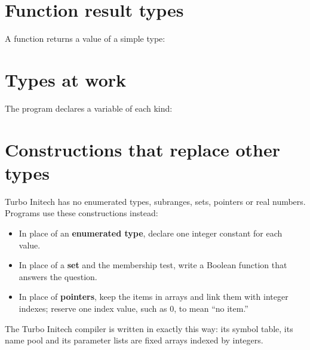 \section{Function result types}
A function returns a value of a simple type:


\section{Types at work}
The program  declares a variable of each kind:



\section{Constructions that replace other types}
Turbo Initech has no enumerated types, subranges, sets, pointers or real
numbers.  Programs use these constructions instead:

\begin{itemize}
\item In place of an \textbf{enumerated type}, declare one integer constant
  for each value.
\item In place of a \textbf{set} and the membership test, write a Boolean
  function that answers the question.
\item In place of \textbf{pointers}, keep the items in arrays and link
  them with integer indexes; reserve one index value, such as 0, to mean
  ``no item.''
\end{itemize}



The Turbo Initech compiler is written in exactly this way: its symbol
table, its name pool and its parameter lists are fixed arrays indexed by
integers.
